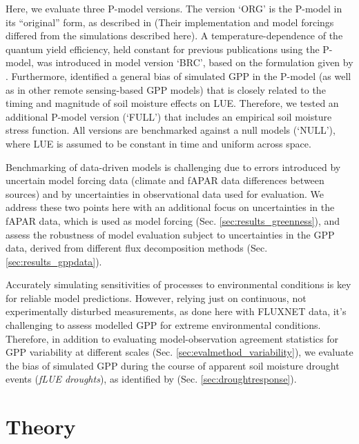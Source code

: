 \documentclass{myreport}
\begin{document}
Here, we evaluate three P-model versions. The version `ORG' is the P-model in its ``original'' form, as described in \cite{wang17natpl} (Their implementation and model forcings differed from the simulations described here). A temperature-dependence of the quantum yield efficiency, held constant for previous publications using the P-model, was introduced in model version `BRC', based on the formulation given by \cite{bernacchi03pce}. Furthermore, \cite{stocker19natgeo} identified a general bias of simulated GPP in the P-model (as well as in other remote sensing-based GPP models) that is closely related to the timing and magnitude of soil moisture effects on LUE. Therefore, we tested an additional P-model version (`FULL') that includes an empirical soil moisture stress function. All versions are benchmarked against a null models (`NULL'), where LUE is assumed to be constant in time and uniform across space. %

Benchmarking of data-driven models is challenging due to errors introduced by uncertain model forcing data \citep{ryu19rse} (climate and fAPAR data differences between sources) and by uncertainties in observational data used for evaluation. We address these two points here with an additional focus on uncertainties in the fAPAR data, which is used as model forcing (Sec. \ref{sec:results_greenness}), and assess the robustness of model evaluation subject to uncertainties in the GPP data, derived from different flux decomposition methods (Sec. \ref{sec:results_gppdata}). 

Accurately simulating sensitivities of processes to environmental conditions is key for reliable model predictions. However, relying just on continuous, not experimentally disturbed measurements, as done here with FLUXNET data, it's challenging to assess modelled GPP for extreme environmental conditions. Therefore, in addition to evaluating model-observation agreement statistics for GPP variability at different scales (Sec. \ref{sec:evalmethod_variability}), we evaluate the bias of simulated GPP during the course of apparent soil moisture drought events (\textit{fLUE droughts}), as identified by \cite{stocker18newphyt} (Sec. \ref{sec:droughtresponse}).

\section{Theory}
\label{sec:theory}
\end{document}
